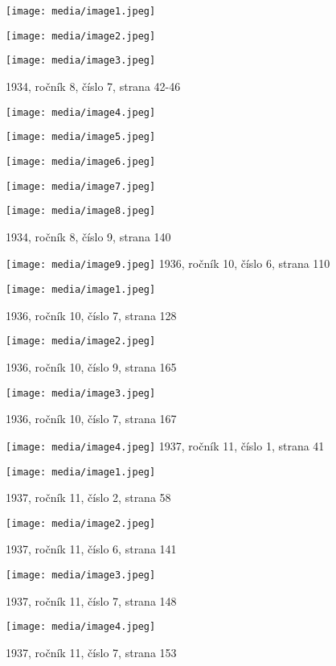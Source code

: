 \texttt{[image: media/image1.jpeg]}

\texttt{[image: media/image2.jpeg]}

\texttt{[image: media/image3.jpeg]}

1934, ročník 8, číslo 7, strana 42-46

\texttt{[image: media/image4.jpeg]}

\texttt{[image: media/image5.jpeg]}

\texttt{[image: media/image6.jpeg]}

\texttt{[image: media/image7.jpeg]}

\texttt{[image: media/image8.jpeg]}

1934, ročník 8, číslo 9, strana 140

\texttt{[image: media/image9.jpeg]}
1936, ročník 10, číslo 6, strana 110

\texttt{[image: media/image1.jpeg]}

1936, ročník 10, číslo 7, strana 128

\texttt{[image: media/image2.jpeg]}

1936, ročník 10, číslo 9, strana 165

\texttt{[image: media/image3.jpeg]}

1936, ročník 10, číslo 7, strana 167

\texttt{[image: media/image4.jpeg]}
1937, ročník 11, číslo 1, strana 41

\texttt{[image: media/image1.jpeg]}

1937, ročník 11, číslo 2, strana 58

\texttt{[image: media/image2.jpeg]}

1937, ročník 11, číslo 6, strana 141

\texttt{[image: media/image3.jpeg]}

1937, ročník 11, číslo 7, strana 148

\texttt{[image: media/image4.jpeg]}

1937, ročník 11, číslo 7, strana 153

